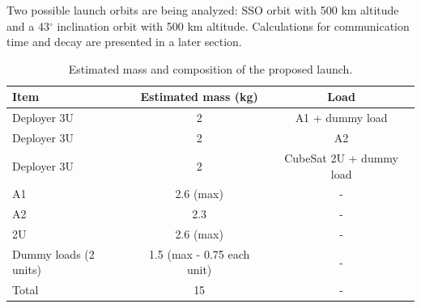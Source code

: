 Two possible launch orbits are being analyzed: SSO orbit with 500 km altitude and a 43$^{\circ}$ inclination orbit with 500 km altitude. Calculations for communication time and decay are presented in a later section.

\begin{table}[H]
    \centering
    \begin{tabular}{lcc}
        \toprule[1.5pt]
        \textbf{Item} & \textbf{Estimated mass (kg)} & \textbf{Load} \\
        \midrule
        Deployer 3U           & 2                          & A1 + dummy load \\
        Deployer 3U           & 2                          & A2 \\
        Deployer 3U           & 2                          & CubeSat 2U + dummy load \\
        A1                    & 2.6 (max)                  & - \\
        A2                    & 2.3                        & - \\
        2U                    & 2.6 (max)                  & - \\
        Dummy loads (2 units) & 1.5 (max - 0.75 each unit) & - \\
        Total                 & 15                         & - \\
        \bottomrule[1.5pt]
    \end{tabular}
    \caption{Estimated mass and composition of the proposed launch.}
    \label{tab:tabela_mass_lancamento}
\end{table}
